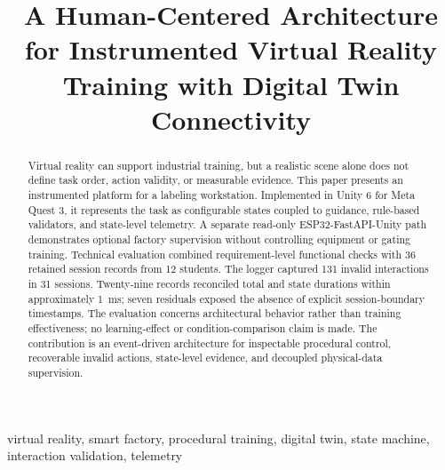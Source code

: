 \documentclass[conference]{IEEEtran}
\begin{document}
\title{\huge A Human-Centered Architecture for Instrumented Virtual Reality Training with Digital Twin Connectivity}

\author{
\and
{}
}

\maketitle

\begin{abstract}
Virtual reality can support industrial training, but a realistic scene alone does not define task order, action validity, or measurable evidence. This paper presents an instrumented platform for a labeling workstation. Implemented in Unity 6 for Meta Quest 3, it represents the task as configurable states coupled to guidance, rule-based validators, and state-level telemetry. A separate read-only ESP32-FastAPI-Unity path demonstrates optional factory supervision without controlling equipment or gating training. Technical evaluation combined requirement-level functional checks with 36 retained session records from 12 students. The logger captured 131 invalid interactions in 31 sessions. Twenty-nine records reconciled total and state durations within approximately 1~ms; seven residuals exposed the absence of explicit session-boundary timestamps. The evaluation concerns architectural behavior rather than training effectiveness; no learning-effect or condition-comparison claim is made. The contribution is an event-driven architecture for inspectable procedural control, recoverable invalid actions, state-level evidence, and decoupled physical-data supervision.
\end{abstract}

\begin{IEEEkeywords}
virtual reality, smart factory, procedural training, digital twin, state machine, interaction validation, telemetry
\end{IEEEkeywords}
\end{document}
